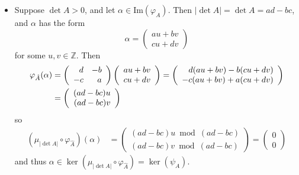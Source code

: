 \documentclass{article}
\begin{document}
\begin{Answer}
\begin{enumerate}[(a)]
{\begin{itemize}
{        so $\mu_n$ is a homomorphism. Let $A \in
        \mathrm{GL}_2(\mathbb{Z})$. Then $\det A \neq 0$ and therefore
        $|\det A|$ is a positive integer, so
        $\psi_A = \mu_{|\det A|} \circ \varphi_{\hat{A}}$ is a
        composition of homomorphisms and thus a homomorphism itself.
      }
      \item{
        Suppose $\det A > 0$, and let $\alpha \in
        \mathrm{Im}(\varphi_A)$.
        Then $|\det A| = \det A = ad - bc$, and
        $\alpha$ has the form
        $$
        \alpha =
        \left(\begin{array}{c}
          a u + b v \\
          c u + d v
        \end{array}\right)
        $$
        for some $u, v \in \mathbb{Z}$. Then
        \begin{align*}
        \varphi_{\hat{A}}(\alpha) &=
        \left(\begin{array}{r r}
           d & -b \\
          -c &  a
        \end{array}\right)
        \left(\begin{array}{c}
          a u + b v \\
          c u + d v
        \end{array}\right) =
        \left(\begin{array}{r}
          d(a u + b v) - b(c u + d v) \\
         -c(a u + b v) + a(c u + d v)
        \end{array}\right) \\ &=
        \left(\begin{array}{r}
          (a d - b c) u \\
          (a d - b c) v
        \end{array}\right)
        \end{align*}
        so
        \begin{align*}
        (\mu_{|\det A|} \circ \varphi_{\hat{A}})(\alpha) &=
        \left(\begin{array}{r}
          (a d - b c) u \bmod (ad - bc) \\
          (a d - b c) v \bmod (ad - bc)
        \end{array}\right) =
        \left(\begin{array}{r}
          0 \\
          0
        \end{array}\right)
        \end{align*}
        and thus $\alpha \in \ker(\mu_{|\det A|} \circ
        \varphi_{\hat{A}}) = \ker(\psi_A)$.

}
\end{itemize}}
\end{enumerate}
\end{Answer}
\end{document}
